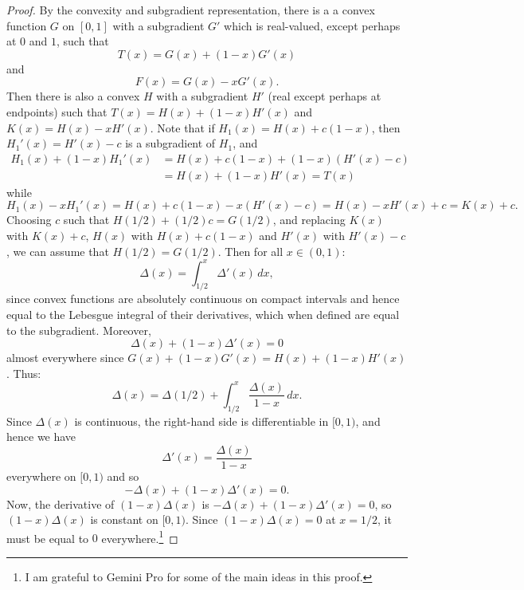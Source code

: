 \documentclass[11pt]{amsart} %
\begin{document}
\begin{proof}
By the convexity and subgradient representation, there is a a convex function $G$
on $[0,1]$ with a subgradient $G'$ which is real-valued, except perhaps at $0$ and $1$, such that
$$
	T(x)=G(x)+(1-x)G'(x)
$$
and
$$
	F(x)=G(x)-x G'(x).
$$
Then there is also a convex $H$ with a subgradient $H'$ (real except perhaps at endpoints) such that 
$T(x)=H(x)+(1-x)H'(x)$ and $K(x)=H(x)-xH'(x)$. 
Note that if $H_1(x)=H(x)+c(1-x)$, then $H_1'(x)=H'(x)-c$ is a subgradient of $H_1$, and
$$
\begin{aligned}
	H_1(x)+(1-x)H_1'(x)&=H(x)+c(1-x)+(1-x)(H'(x)-c)\\
		&=H(x)+(1-x)H'(x)=T(x)
\end{aligned}	
$$
while
$$
	H_1(x)-xH_1'(x)=H(x)+c(1-x)-x(H'(x)-c)=H(x)-xH'(x)+c=K(x)+c.
$$
Choosing $c$ such that $H(1/2)+(1/2)c=G(1/2)$, and replacing $K(x)$ with
$K(x)+c$, $H(x)$ with $H(x)+c(1-x)$ and $H'(x)$ with $H'(x)-c$, we can assume
that $H(1/2)=G(1/2)$.
Then for all $x\in (0,1)$:
$$
	\Delta(x) = \int_{1/2}^x \Delta'(x) \, dx,
$$
since convex functions are absolutely continuous on compact intervals and hence equal to the
Lebesgue integral of their derivatives, which when defined are equal to the subgradient. Moreover,
$$
	\Delta(x)+(1-x)\Delta'(x)=0
$$
almost everywhere since $G(x)+(1-x)G'(x)=H(x)+(1-x)H'(x)$. Thus:
$$
	\Delta(x) = \Delta(1/2)+\int_{1/2}^x \frac{\Delta(x)}{1-x} \, dx.
$$
Since $\Delta(x)$ is continuous, the right-hand side is differentiable in $[0,1)$, and hence we have
$$
	\Delta'(x) = \frac{\Delta(x)}{1-x}
$$
everywhere on $[0,1)$ and so
$$
-\Delta(x)+(1-x)\Delta'(x)=0. 
$$
Now, the derivative of $(1-x)\Delta(x)$ is $-\Delta(x)+(1-x)\Delta'(x)=0$, so $(1-x)\Delta(x)$ 
is constant on $[0,1)$. Since $(1-x)\Delta(x)=0$ at $x=1/2$, it must be equal to $0$ everywhere.\footnote{I am 
grateful to Gemini Pro for some of the main ideas in this proof.}
\end{proof}
\end{document}
